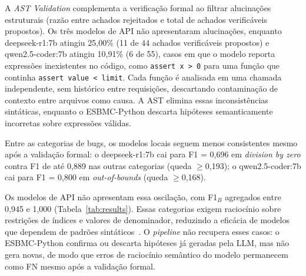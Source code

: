 \documentclass[sigconf]{acmart}
\begin{document}
A \textit{AST Validation} complementa a verificação formal ao filtrar alucinações estruturais (razão entre achados rejeitados e total de achados verificáveis propostos). Os três modelos de API não apresentaram alucinações, enquanto deepseek-r1:7b atingiu 25,00\% (11 de 44 achados verificáveis propostos) e qwen2.5-coder:7b atingiu 10,91\% (6 de 55), casos em que o modelo reporta expressões inexistentes no código, como \texttt{assert x > 0} para uma função que continha \texttt{assert value < limit}. Cada função é analisada em uma chamada independente, sem histórico entre requisições, descartando contaminação de contexto entre arquivos como causa. A AST elimina essas inconsistências sintáticas, enquanto o ESBMC-Python descarta hipóteses semanticamente incorretas sobre expressões válidas.


Entre as categorias de bugs, os modelos locais seguem menos consistentes mesmo após a validação formal: o deepseek-r1:7b cai para F1 = 0,696 em \textit{division by zero} contra F1 de até 0,889 nas outras categorias (queda $\geq$0,193); o qwen2.5-coder:7b cai para F1 = 0,800 em \textit{out-of-bounds} (queda $\geq$0,168).


Os modelos de API não apresentam essa oscilação, com F1$_B$ agregados entre 0,945 e 1,000 (Tabela~\ref{tab:results}). Essas categorias exigem raciocínio sobre restrições de índices e valores de denominador, reduzindo a eficácia de modelos que dependem de padrões sintáticos~\cite{ding2025primevul}. O \textit{pipeline} não recupera esses casos: o ESBMC-Python confirma ou descarta hipóteses já geradas pela LLM, mas não gera novas, de modo que erros de raciocínio semântico do modelo permanecem como FN mesmo após a validação formal.
\end{document}
